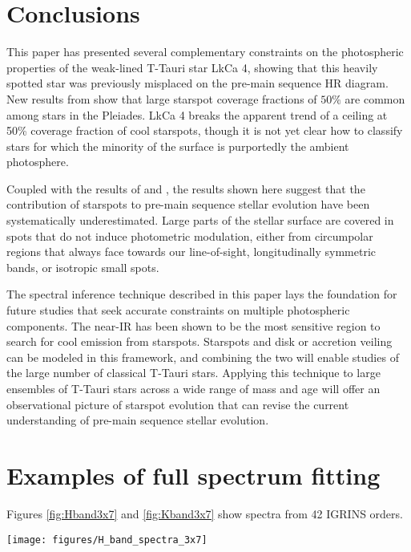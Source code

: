 \documentclass[twocolumn]{emulateapj}%
\begin{document}
\section{Conclusions}
This paper has presented several complementary constraints on the photospheric properties of the weak-lined T-Tauri star LkCa 4, showing that this heavily spotted star was previously misplaced on the pre-main sequence HR diagram.  New results from \citet{fang2016} show that large starspot coverage fractions of $50\%$ are common among stars in the Pleiades.  LkCa 4 breaks the apparent trend of a ceiling at 50\% coverage fraction of cool starspots, though it is not yet clear how to classify stars for which the minority of the surface is purportedly the ambient photosphere.

Coupled with the results of \citet{fang2016} and \citet{covey16}, the results shown here suggest that the contribution of starspots to pre-main sequence stellar evolution have been systematically underestimated.  Large parts of the stellar surface are covered in spots that do not induce photometric modulation, either from circumpolar regions that always face towards our line-of-sight, longitudinally symmetric bands, or isotropic small spots.

The spectral inference technique described in this paper lays the foundation for future studies that seek accurate constraints on multiple photospheric components.  The near-IR has been shown to be the most sensitive region to search for cool emission from starspots.  Starspots and disk or accretion veiling can be modeled in this framework, and combining the two will enable studies of the large number of classical T-Tauri stars.  Applying this technique to large ensembles of T-Tauri stars across a wide range of mass and age will offer an observational picture of starspot evolution that can revise the current understanding of pre-main sequence stellar evolution.  


\clearpage
\pagebreak


\appendix

\section{Examples of full spectrum fitting}

Figures \ref{fig:Hband3x7} and \ref{fig:Kband3x7} show spectra from 42 IGRINS orders.


\begin{figure*}
 \centering
 \texttt{[image: figures/H\_band\_spectra\_3x7]}
 \caption{IGRINS Orders 94 and $99-119$.  Note that the $y-$axis is on a logarithmic scale.  The red line is the cool photosphere while the blue line is the hot photosphere.  The purple line is the composite mixture model.}
 \label{fig:Hband3x7}
\end{figure*}
\end{document}

